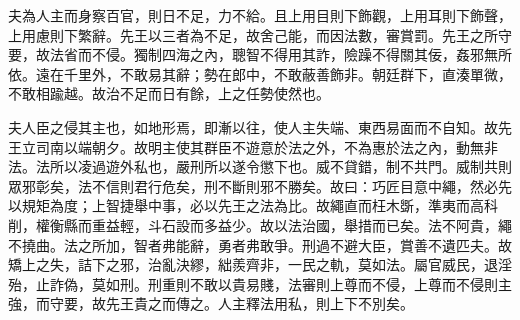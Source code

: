 \begin{pinyinscope}
夫為人主而身察百官，則日不足，力不給。且上用目則下飾觀，上用耳則下飾聲，上用慮則下繁辭。先王以三者為不足，故舍己能，而因法數，審賞罰。先王之所守要，故法省而不侵。獨制四海之內，聰智不得用其詐，險躁不得關其佞，姦邪無所依。遠在千里外，不敢易其辭；勢在郎中，不敢蔽善飾非。朝廷群下，直湊單微，不敢相踰越。故治不足而日有餘，上之任勢使然也。

夫人臣之侵其主也，如地形焉，即漸以往，使人主失端、東西易面而不自知。故先王立司南以端朝夕。故明主使其群臣不遊意於法之外，不為惠於法之內，動無非法。法所以凌過遊外私也，嚴刑所以遂令懲下也。威不貸錯，制不共門。威制共則眾邪彰矣，法不信則君行危矣，刑不斷則邪不勝矣。故曰：巧匠目意中繩，然必先以規矩為度；上智捷舉中事，必以先王之法為比。故繩直而枉木斲，準夷而高科削，權衡縣而重益輕，斗石設而多益少。故以法治國，舉措而已矣。法不阿貴，繩不撓曲。法之所加，智者弗能辭，勇者弗敢爭。刑過不避大臣，賞善不遺匹夫。故矯上之失，詰下之邪，治亂決繆，絀羨齊非，一民之軌，莫如法。屬官威民，退淫殆，止詐偽，莫如刑。刑重則不敢以貴易賤，法審則上尊而不侵，上尊而不侵則主強，而守要，故先王貴之而傳之。人主釋法用私，則上下不別矣。


\end{pinyinscope}